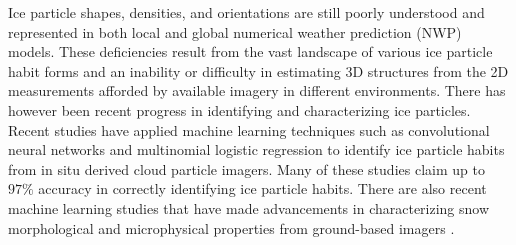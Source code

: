 \documentclass[amt, manuscript]{copernicus}
\begin{document}






\introduction  %
Ice particle shapes, densities, and orientations are still poorly understood and represented in both local and global numerical weather prediction (NWP) models. These deficiencies result from the vast landscape of various ice particle habit forms and an inability or difficulty in estimating 3D structures from the 2D measurements afforded by available imagery in different environments. There has however been recent progress in identifying and characterizing ice particles. Recent studies have applied machine learning techniques such as convolutional neural networks \citep{Xiao2019,Przybylo2022b,Jaffeux2022,Zhang2023} and multinomial logistic regression \citep{Praz2018} to identify ice particle habits from in situ derived cloud particle imagers. Many of these studies claim up to $97\%$ accuracy in correctly identifying ice particle habits. There are also recent machine learning studies that have made advancements in characterizing snow morphological and microphysical properties from ground-based imagers \citep{Leinonen2021}. 
\end{document}
